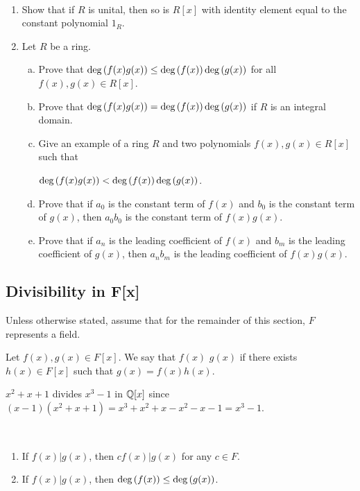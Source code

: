 \documentclass[11pt,fleqn,dvipsnames,usenames]{article}
\newcommand{\p}{\noindent}
\begin{document}
\begin{exercises}\label{sumofdegreesexercises}~
\begin{enumerate}[1.]
\item Show that if $R$ is unital, then so is $R[x]$ with identity element equal to the constant polynomial $1_{R}$.
\item \label{sumofdegrees} Let $R$ be a ring.
\begin{enumerate}[(a)]
\item Prove that $\text{deg}\left(f(x)g(x)\right)\leq \text{deg}\left(f(x)\right)\text{deg}\left(g(x)\right)$ for all $f(x),g(x)\in R[x]$.
\item Prove that $\text{deg}\left(f(x)g(x)\right)= \text{deg}\left(f(x)\right)\text{deg}\left(g(x)\right)$ if $R$ is an integral domain.\label{sumofdegreesdomain}
\item Give an example of a ring $R$ and two polynomials $f(x),g(x)\in R[x]$ such that
\begin{center}
$\text{deg}\left(f(x)g(x)\right) < \text{deg}\left(f(x)\right)\text{deg}\left(g(x)\right)$.
\end{center}
\item Prove that if $a_{0}$ is the constant term of $f(x)$ and $b_{0}$ is the constant term of $g(x)$, then $a_{0}b_{0}$ is the constant term of $f(x)g(x)$.
\item Prove that if $a_{n}$ is the leading coefficient of $f(x)$ and $b_{m}$ is the leading coefficient of $g(x)$, then $a_{n}b_{m}$ is the leading coefficient of $f(x)g(x)$.
\end{enumerate}
\end{enumerate}
\end{exercises}
\newpage

\subsection{Divisibility in F[x]}

\p Unless otherwise stated, assume that for the remainder of this section, $F$ represents a field.
%
\begin{definition}
Let $f(x),g(x)\in F[x]$.  We say that $f(x)$  $g(x)$ if there exists $h(x)\in F[x]$ such that $g(x) = f(x)h(x)$.
\end{definition}
%
\begin{example}
$x^2 + x + 1$ divides $x^3 - 1$ in $\mathbb{Q}[x]$ since $(x-1)(x^2 + x + 1) = x^3 + x^2 + x - x^2 - x - 1 = x^3 - 1$.
\end{example}
\vsmsp

%
\begin{remarks}~
\begin{enumerate}[(1)]
\item If $f(x)|g(x)$, then $cf(x)|g(x)$ for any $c\in F$.
\item If $f(x)|g(x)$, then $\text{deg}\left(f(x)\right)\leq \text{deg}\left(g(x)\right)$.
\end{enumerate}
\end{remarks}
\vsmsp
\end{document}
